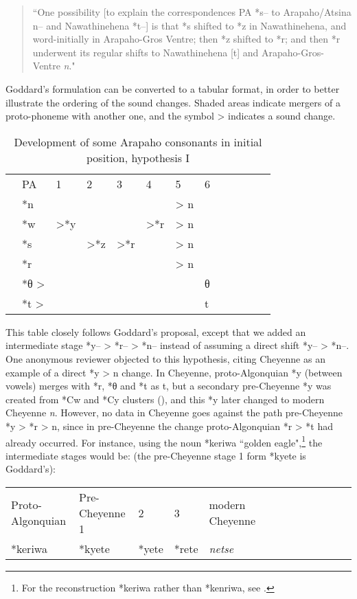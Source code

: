 \documentclass[oldfontcommands,oneside,a4paper,11pt]{article}
\newcommand{\grise}[1]{\cellcolor{lightgray}\textbf{#1}}
\begin{document}
\begin{quote}
``One possibility [to explain the correspondences PA *s-- to Arapaho/Atsina n-- and Nawathinehena *t--] is that *s shifted to *z in Nawathinehena, and word-initially in Arapaho-Gros Ventre; then *z shifted to *r; and then *r underwent its regular shifts to Nawathinehena [t] and Arapaho-Gros-Ventre \textit{n}."
\end{quote}  
Goddard's formulation can be converted to a tabular format, in order to better illustrate the ordering of the sound changes.  Shaded areas indicate mergers of a proto-phoneme with another one, and the symbol > indicates a sound change. 
\begin{table}[H]
\caption{Development of some Arapaho  consonants in initial position, hypothesis I}  \centering
\begin{tabular}{lllllllllllll}
&PA & 1 & 2 & 3 & 4 & 5 & 6 & \\
&*n   &&&&& > n\\
&*w   & >*y  \grise{} & \grise{} & \grise{}  &>*r	  \grise{} &> n \grise{}\\
&*s  &  &>*z &>*r	 \grise{}& 	 \grise{} &> n \grise{}\\
&*r	   & 	&  & 	& 	  &> n \grise{}\\
&*θ >  & &&&&&θ \\
&*t > & &&&&&t \\
\end{tabular}
\end{table}
This table closely follows Goddard's proposal, except that we added an intermediate stage *y-- > *r-- > *n-- instead of assuming a direct shift *y-- > *n--. One anonymous reviewer objected to this hypothesis, citing Cheyenne as an example of a direct *y > n change. In Cheyenne, proto-Algonquian *y (between vowels) merges with *r, *θ and *t as t, but a secondary pre-Cheyenne *y was created from *Cw and *Cy clusters (\citealt[348]{goddard88cheyenne.y}), and this *y later changed to modern Cheyenne \textit{n}. However, no data in Cheyenne goes against the path pre-Cheyenne *y > *r > n, since in pre-Cheyenne the change proto-Algonquian *r > *t had already occurred. For instance, using the noun *keriwa ``golden eagle",\footnote{For the reconstruction *keriwa rather than *kenriwa, see \citet[356]{goddard88cheyenne.y}.} the intermediate stages would be: (the pre-Cheyenne stage 1 form *kyete  is Goddard's):


\begin{tabular}{lllllllllllll}
Proto-Algonquian & Pre-Cheyenne 1 & 2 & 3 & modern Cheyenne \\
*keriwa & *kyete &*yete &*rete &\textit{netse}\\
\end{tabular}
\end{document}
